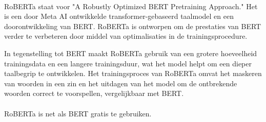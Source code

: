 \paragraph{}
RoBERTa staat voor "A Robustly Optimized BERT Pretraining Approach." Het is een door Meta AI ontwikkelde transformer-gebaseerd taalmodel en een doorontwikkeling van BERT. RoBERTa is ontworpen om de prestaties van BERT verder te verbeteren door middel van optimalisaties in de trainingsprocedure.

In tegenstelling tot BERT maakt RoBERTa gebruik van een grotere hoeveelheid trainingsdata en een langere trainingsduur, wat het model helpt om een dieper taalbegrip te ontwikkelen. Het trainingsproces van RoBERTa omvat het maskeren van woorden in een zin en het uitdagen van het model om de ontbrekende woorden correct te voorspellen, vergelijkbaar met BERT.

\paragraph{}
RoBERTa is net als BERT gratis te gebruiken.


%
%
%

